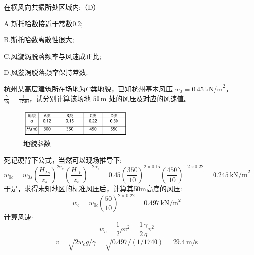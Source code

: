 \documentclass[12pt, a4paper, oneside, UTF8]{ctexbook}
\begin{document}
\begin{example}
    在横风向共振所处区域内:（D）

    A.斯托哈数接近于常数0.2; 

    B.斯托哈数离散性很大;

    C.风漩涡脱落频率与风速成正比; 

    D.风漩涡脱落频率保持常数.
\end{example}

\begin{example}
    杭州某高层建筑所在场地为C类地貌，已知杭州基本风压 $w_0 = 0.45\,\mathrm{kN/m}^2$，$\frac{\gamma}{2g} = \frac{1}{1740}$，试分别计算该场地 $50\,\mathrm{m}$ 处的风压及对应的风速值。

    \begin{figure}[H]
        \centering
        \includegraphics[width=0.5\textwidth]{../figure/3.png}
        \caption{地貌参数}
    \end{figure}

    死记硬背下公式，当然可以现场推导下:
    \[
    w_{0c} = w_{0s} \left( \frac{H_{Ts}}{z_s} \right)^{2\alpha_s} \left( \frac{H_{Tc}}{z_c} \right)^{-2\alpha_c}=0.45 \left( \frac{350}{10} \right)^{2 \times 0.15} \left( \frac{450}{10} \right)^{-2 \times 0.22} = 0.245 \,\mathrm{kN/m}^2
    \]
    于是，求得未知地区的标准风压后，计算其50m高度的风压:
    \[
    w_c = w_{0c} (\frac{50}{10})^{2 \times 0.22}=0.497\,\mathrm{kN/m}^2
    \]
    计算风速:
    \[
    w_c = \frac{1}{2} \rho v^2 = \frac{1}{2} \frac{\gamma}{g} v^2
    \]
    \[
    v = \sqrt{2 w_c g / \gamma} = \sqrt{0.497  / (1/1740)} = 29.4\,\mathrm{m/s}
    \]
\end{example}
\end{document}
